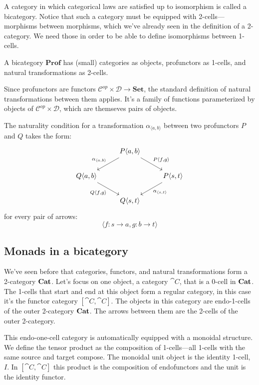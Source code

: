 \documentclass[DaoFP]{subfiles}
\begin{document}
A category in which categorical laws are satisfied up to isomorphism is called a bicategory. Notice that such a category must be equipped with 2-cells---morphisms between morphisms, which we've already seen in the definition of a 2-category. We need those in order to be able to define isomorphisms between 1-cells. 

A bicategory $\mathbf{Prof}$ has (small) categories as objects, profunctors as 1-cells, and natural transformations as 2-cells. 

Since profunctors are functors $\mathcal{C}^{op} \times  \mathcal{D} \to \mathbf{Set}$, the standard definition of natural transformations between them applies. It's a family of functions parameterized by objects of $\mathcal{C}^{op} \times  \mathcal{D}$, which are themseves pairs of objects. 

The naturality condition for a transformation $\alpha_{\langle a, b \rangle}$ between two profunctors $P$ and $Q$ takes the form:
\[
 \begin{tikzcd}
 &P \langle a, b \rangle
 \arrow[ld, "{\alpha_{\langle a, b \rangle}}"']
 \arrow[rd, "{P \langle f, g \rangle}"]
 \\
 Q \langle a, b \rangle
 \arrow[dr, "{Q \langle f, g \rangle}"']
 &&P \langle s, t \rangle
 \arrow[dl, "{\alpha_{\langle s, t \rangle}}"]
 \\
 & Q \langle s, t \rangle
 \end{tikzcd}
\]
for every pair of arrows:
\[ \langle f \colon s \to a, g \colon b \to t \rangle \]

\subsection{Monads in a bicategory}

We've seen before that categories, functors, and natural transformations form a 2-category $\mathbf{Cat}$. Let's focus on one object, a category $\cat C$, that is a 0-cell in $\mathbf{Cat}$. The 1-cells that start and end at this object form a regular category, in this case it's the functor category $[\cat C, \cat C]$. The objects in this category are endo-1-cells of the outer 2-category $\mathbf{Cat}$. The arrows between them are the 2-cells of the outer 2-category.

This endo-one-cell category is automatically equipped with a monoidal structure. We define the tensor product as the composition of 1-cells---all 1-cells with the same source and target compose. The monoidal unit object is the identity 1-cell, $I$. In $[\cat C, \cat C]$ this product is the composition of endofunctors and the unit is the identity functor. 
\end{document}
